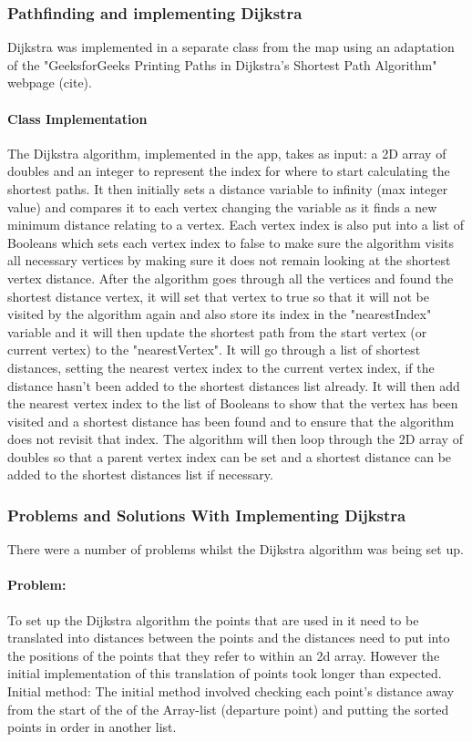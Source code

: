 \documentclass[12pt,a4paper]{article}
\begin{document}
\subsubsection{Pathfinding and implementing Dijkstra}
Dijkstra was implemented in a separate class from the map using an adaptation of the "GeeksforGeeks Printing Paths in Dijkstra's Shortest Path Algorithm" webpage (cite). 

\paragraph{Class Implementation}
The Dijkstra algorithm, implemented in the app, takes as input: a 2D array of doubles and an integer to represent the index for where to start calculating the shortest paths. It then initially sets a distance variable to infinity (max integer value) and compares it to each vertex changing the variable as it finds a new minimum distance relating to a vertex. Each vertex index is also put into a list of Booleans which sets each vertex index to false to make sure the algorithm visits all necessary vertices by making sure it does not remain looking at the shortest vertex distance. After the algorithm goes through all the vertices and found the shortest distance vertex, it will set that vertex to true so that it will not be visited by the algorithm again and also store its index in the "nearestIndex" variable and it will then update the shortest path from the start vertex (or current vertex) to the "nearestVertex". It will go through a list of shortest distances, setting the nearest vertex index to the current vertex index, if the distance hasn't been added to the shortest distances list already. It will then add the nearest vertex index to the list of Booleans to show that the vertex has been visited and a shortest distance has been found and to ensure that the algorithm does not revisit that index. The algorithm will then loop through the 2D array of doubles so that a parent vertex index can be set and a shortest distance can be added to the shortest distances list if necessary. 

\subsubsection{Problems and Solutions With Implementing Dijkstra}
There were a number of problems whilst the Dijkstra algorithm was being set up.

\paragraph{Problem:}
To set up the Dijkstra algorithm the points that are used in it need to be translated into distances between the points and the distances need to put into the positions of the points that they refer to within an 2d array. However the initial implementation of this translation of points took longer than expected.
Initial method: 
The initial method involved checking each point's distance away from the start of the of the Array-list (departure point) and putting the sorted points in order in another list. 
\end{document}
